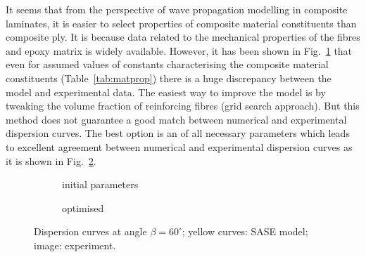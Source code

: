 It seems that from the perspective of wave propagation modelling in composite laminates, it is easier to select properties of composite material constituents than composite ply. It is because data related to the mechanical properties of the fibres and epoxy matrix is widely available. However, it has been shown in Fig.~\ref{fig:dispersion60deg_initial} that even for   assumed values of constants characterising the composite material constituents (Table~\ref{tab:matprop}) there is a huge discrepancy between the model and experimental data. The easiest way to improve the model is by tweaking the volume fraction of reinforcing fibres (grid search approach). But this method does not guarantee a good match between numerical and experimental dispersion curves. The best option is an 
  of all necessary parameters  which leads to excellent agreement between numerical and experimental dispersion curves as it is shown in Fig.~\ref{fig:dispersion60deg}. 
	
\begin{figure} [h!]
		\centering
		\begin{subfigure}[b]{0.49\textwidth}
			\centering
			
			
			
\caption{initial parameters}
			\label{fig:dispersion60deg_initial}
		\end{subfigure}
		\begin{subfigure}[b]{0.49\textwidth}
			\centering
			
			
		
			
\caption{optimised}
			\label{fig:dispersion60deg}
		\end{subfigure}
	
\caption{Dispersion curves at angle \(\beta=60^{\circ}\); yellow curves: SASE 
	model; 
	image: experiment. }

	\label{fig:initial_optimized}
	\end{figure}

